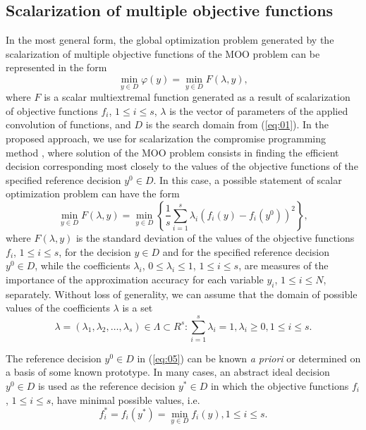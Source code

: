 \documentclass[runningheads]{llncs}
\begin{document}
\subsection{Scalarization of multiple objective functions}
\label{subsec:31}
 
In the most general form, the global optimization problem generated by the scalarization of multiple objective functions of the MOO problem can be represented in the form
\begin{equation}
\label{eq:04}
\min_{y \in D} {\varphi(y)} = \min_{y \in D} F(\lambda, y),
\end{equation}
where $F$ is a scalar multiextremal function generated as a result of scalarization of objective functions $f_i$, $1 \leq i \leq s$, $\lambda$ is the vector of parameters of the applied convolution of functions, and $D$ is the search domain from (\ref{eq:01}). In the proposed approach, we use for scalarization the compromise programming method \cite{c2,c11}, where solution of the MOO problem consists in finding the efficient decision corresponding most closely to the values of the objective functions of the specified reference decision $y^0 \in D$. In this case, a possible statement of scalar optimization problem can have the form 
\begin{equation}
\label{eq:05}
\min_{y \in D} F(\lambda,y)=\min_{y \in D} \left\{ \frac{1}{s} \sum_{i=1}^s {\lambda_i (f_i (y)-f_i (y^0 ))^2} \right\},
\end{equation}
where $F(\lambda,y)$ is the standard deviation of the values of the objective functions $f_i$, $1 \leq i \leq s$, for the decision $y \in D$ and for the specified reference decision $y^0 \in D$, while the coefficients $\lambda_i$, $0 \leq \lambda_i \leq 1$, $1 \leq i \leq s$, are measures of the importance of the approximation accuracy for each variable $y_i$, $1 \leq i \leq N$, separately. Without loss of generality, we can assume that the domain of possible values of the coefficients $\lambda$ is a set 
\begin{equation}
\label{eq:06}
\lambda=(\lambda_1,\lambda_2, \dots, \lambda_s)\in \Lambda \subset R^s: \sum_{i=1}^{s}\lambda_i=1, \lambda_i \geq 0, 1 \leq i \leq s.
\end{equation}

The reference decision $y^0 \in D$ in (\ref{eq:05}) can be known \textit{a priori} or determined on a basis of some known prototype. In many cases, an abstract ideal decision $y^0 \in D$ is used as the reference decision $y^*\in D$ in which the objective functions $f_i$, $1 \leq i \leq s$, have minimal possible values, i.e.
\begin{equation}
\label{eq:07}
f_i^* =f_i (y^*)=\min_{y \in D} f_i (y), 1 \leq i \leq s.
\end{equation}
\end{document}
